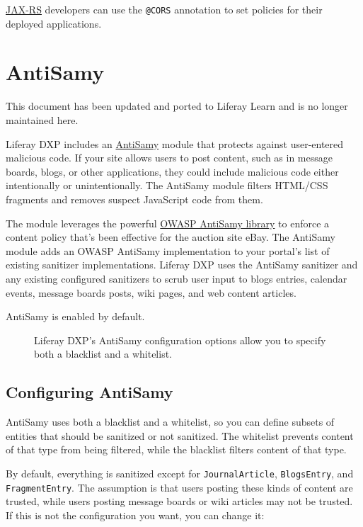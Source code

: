\href{/docs/7-2/frameworks/-/knowledge_base/f/jax-rs}{JAX-RS} developers
can use the \texttt{@CORS} annotation to set policies for their deployed
applications.

\chapter{AntiSamy}\label{antisamy}

{This document has been updated and ported to Liferay Learn and is no
longer maintained here.}

Liferay DXP includes an
\href{https://www.owasp.org/index.php/Category:OWASP_AntiSamy_Project}{AntiSamy}
module that protects against user-entered malicious code. If your site
allows users to post content, such as in message boards, blogs, or other
applications, they could include malicious code either intentionally or
unintentionally. The AntiSamy module filters HTML/CSS fragments and
removes suspect JavaScript code from them.

The module leverages the powerful
\href{https://www.owasp.org/index.php/Category:OWASP_AntiSamy_Project}{OWASP
AntiSamy library} to enforce a content policy that's been effective for
the auction site eBay. The AntiSamy module adds an OWASP AntiSamy
implementation to your portal's list of existing sanitizer
implementations. Liferay DXP uses the AntiSamy sanitizer and any
existing configured sanitizers to scrub user input to blogs entries,
calendar events, message boards posts, wiki pages, and web content
articles.

AntiSamy is enabled by default.

\begin{figure}
\centering
{}
\caption{Liferay DXP's AntiSamy configuration options allow you to
specify both a blacklist and a whitelist.}
\end{figure}

\section{Configuring AntiSamy}\label{configuring-antisamy}

AntiSamy uses both a blacklist and a whitelist, so you can define
subsets of entities that should be sanitized or not sanitized. The
whitelist prevents content of that type from being filtered, while the
blacklist filters content of that type.

By default, everything is sanitized except for \texttt{JournalArticle},
\texttt{BlogsEntry}, and \texttt{FragmentEntry}. The assumption is that
users posting these kinds of content are trusted, while users posting
message boards or wiki articles may not be trusted. If this is not the
configuration you want, you can change it:

